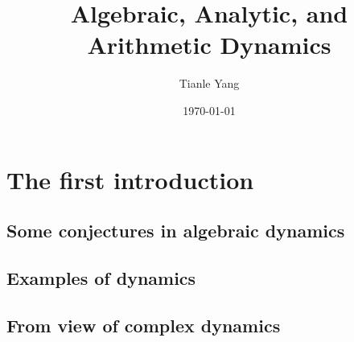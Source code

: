 \documentclass[sectionlevel=book,status=draft]{noteformyself}
\title{Algebraic, Analytic, and Arithmetic Dynamics}
\author{Tianle Yang}
\date{\today}
\begin{document}
   \maketitle

   \frontmatter



   \tableofcontents %

   \mainmatter

    \chapter[
      status=draft,
      tag=000,
      label=\labelNFM{chap:the-first-introduction}
    ]{The first introduction}
        \section[
          status=draft,
          tag=00000,
          label=\labelNFM{sec:the-first-introduction:some-conjectures}
        ]{Some conjectures in algebraic dynamics}
        
        \section[
          status=draft,
          tag=00000,
          label=\labelNFM{sec:the-first-introduction:examples-of-dynamics}
        ]{Examples of dynamics}
        
        \section[
          status=draft,
          tag=00000,
          label=\labelNFM{sec:the-first-introduction:from-view-of-complex-dynamics}
        ]{From view of complex dynamics}
        
\end{document}

